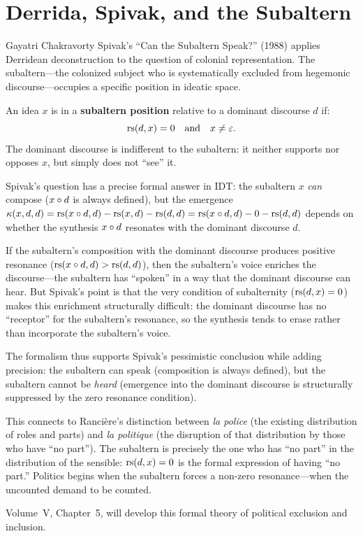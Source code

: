 \section{Derrida, Spivak, and the Subaltern}

Gayatri Chakravorty Spivak's ``Can the Subaltern Speak?'' (1988) applies
Derridean deconstruction to the question of colonial representation. The
subaltern---the colonized subject who is systematically excluded from
hegemonic discourse---occupies a specific position in ideatic space.

\begin{definition}
\label{def:subaltern}
An idea $x$ is in a \textbf{subaltern position} relative to a dominant
discourse $d$ if:
\[
\mathrm{rs}(d, x) = 0 \quad \text{and} \quad x \neq \varepsilon.
\]
The dominant discourse is indifferent to the subaltern: it neither supports
nor opposes $x$, but simply does not ``see'' it.
\end{definition}

\begin{interpretation}
Spivak's question has a precise formal answer in IDT: the subaltern $x$
\emph{can} compose ($x \circ d$ is always defined), but the emergence
$\kappa(x, d, d) = \mathrm{rs}(x \circ d, d) - \mathrm{rs}(x, d) - \mathrm{rs}(d, d)
= \mathrm{rs}(x \circ d, d) - 0 - \mathrm{rs}(d, d)$ depends on whether the synthesis
$x \circ d$ resonates with the dominant discourse $d$.

If the subaltern's composition with the dominant discourse produces positive
resonance ($\mathrm{rs}(x \circ d, d) > \mathrm{rs}(d, d)$), then the subaltern's voice
enriches the discourse---the subaltern has ``spoken'' in a way that the
dominant discourse can hear. But Spivak's point is that the very condition
of subalternity ($\mathrm{rs}(d, x) = 0$) makes this enrichment structurally
difficult: the dominant discourse has no ``receptor'' for the subaltern's
resonance, so the synthesis tends to erase rather than incorporate the
subaltern's voice.

The formalism thus supports Spivak's pessimistic conclusion while adding
precision: the subaltern can speak (composition is always defined), but the
subaltern cannot be \emph{heard} (emergence into the dominant discourse is
structurally suppressed by the zero resonance condition).

This connects to Rancière's distinction between \textit{la police} (the
existing distribution of roles and parts) and \textit{la politique} (the
disruption of that distribution by those who have ``no part''). The subaltern
is precisely the one who has ``no part'' in the distribution of the sensible:
$\mathrm{rs}(d, x) = 0$ is the formal expression of having ``no part.'' Politics
begins when the subaltern forces a non-zero resonance---when the uncounted
demand to be counted.

Volume~V, Chapter~5, will develop this formal theory of political exclusion
and inclusion.
\end{interpretation}

